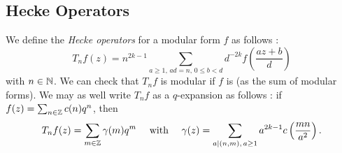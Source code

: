 \subsection{Hecke Operators}
\label{DefHeckeOperators}
We define the \textit{Hecke operators} for a modular form $f$ as follows \cite[p.100]{CourseInArithmetic}:
$$
T_nf(z) = n^{2k-1}\sum_{a \geq 1,\, ad=n,\, 0 \leq b < d} d^{-2k}f \left( \frac{az+b}{d} \right)
$$
with $n \in \mathbb{N}$.
We can check that $T_nf$ is modular if $f$ is (as the sum of modular forms).
We may as well write $T_nf$ as a $q$-expansion as follows \cite[p.100]{CourseInArithmetic}: if $f(z) = \sum_{n \in \mathbb{Z}} c(n)q^n$, then
$$
T_nf(z) = \sum_{m \in \mathbb{Z}} \gamma(m)q^m
\quad \text{ with } \quad 
\gamma(z) = \sum_{a | (n,m),\, a \geq 1} a^{2k-1} c\left( \frac{mn}{a^2} \right).
$$
